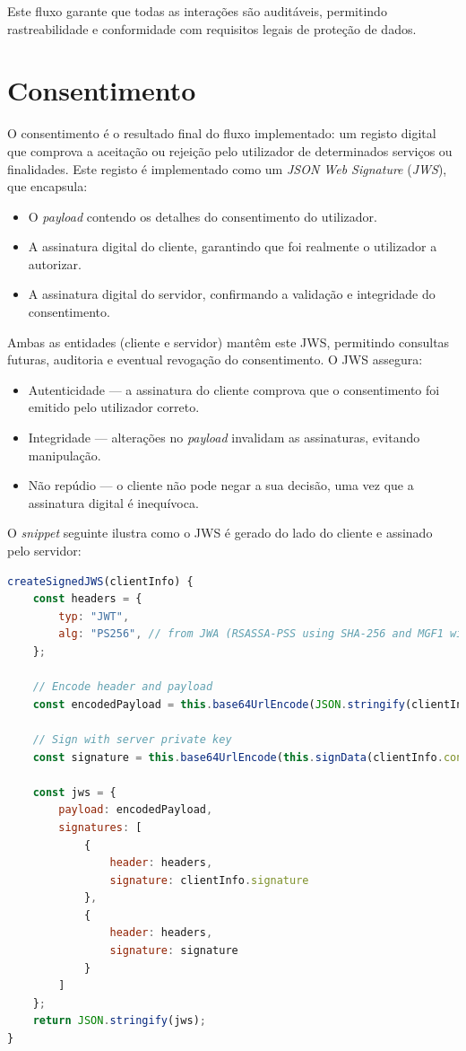 Este fluxo garante que todas as interações são auditáveis, permitindo rastreabilidade e conformidade com requisitos legais de proteção de dados.

\section{Consentimento}

O consentimento é o resultado final do fluxo implementado: um registo digital que comprova a aceitação ou rejeição pelo utilizador de determinados serviços ou finalidades. Este registo é implementado como um \textit{JSON Web Signature} (\textit{JWS}), que encapsula:

\begin{itemize}
    \item O \textit{payload} contendo os detalhes do consentimento do utilizador.
    \item A assinatura digital do cliente, garantindo que foi realmente o utilizador a autorizar.
    \item A assinatura digital do servidor, confirmando a validação e integridade do consentimento.
\end{itemize}

Ambas as entidades (cliente e servidor) mantêm este JWS, permitindo consultas futuras, auditoria e eventual revogação do consentimento. O JWS assegura:

\begin{itemize}
    \item Autenticidade — a assinatura do cliente comprova que o consentimento foi emitido pelo utilizador correto.
    \item Integridade — alterações no \textit{payload} invalidam as assinaturas, evitando manipulação.
    \item Não repúdio — o cliente não pode negar a sua decisão, uma vez que a assinatura digital é inequívoca.
\end{itemize}

O \textit{snippet} seguinte ilustra como o JWS é gerado do lado do cliente e assinado pelo servidor:

\begin{lstlisting}[language=Javascript]
createSignedJWS(clientInfo) {
	const headers = {
		typ: "JWT",
		alg: "PS256", // from JWA (RSASSA-PSS using SHA-256 and MGF1 with SHA-256)
	};

	// Encode header and payload
	const encodedPayload = this.base64UrlEncode(JSON.stringify(clientInfo.consent));

	// Sign with server private key
	const signature = this.base64UrlEncode(this.signData(clientInfo.consent));

	const jws = {
		payload: encodedPayload,
		signatures: [
			{
				header: headers,
				signature: clientInfo.signature
			},
			{
				header: headers,
				signature: signature
			}
		]
	};
	return JSON.stringify(jws);
}
\end{lstlisting}

